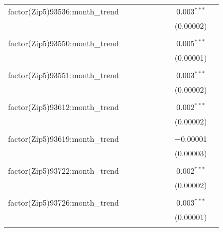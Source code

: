 \begin{table}[H]
{\begin{tabular}{@{\extracolsep{5pt}}lcccccccc}
  factor(Zip5)93536:month\_trend &  &  &  &  &  &  & 0.003$^{***}$ &  \\  

   &  &  &  &  &  &  & (0.00002) &  \\  

   & & & & & & & & \\  

  factor(Zip5)93550:month\_trend &  &  &  &  &  &  & 0.005$^{***}$ &  \\  

   &  &  &  &  &  &  & (0.00001) &  \\  

   & & & & & & & & \\  

  factor(Zip5)93551:month\_trend &  &  &  &  &  &  & 0.003$^{***}$ &  \\  

   &  &  &  &  &  &  & (0.00002) &  \\  

   & & & & & & & & \\  

  factor(Zip5)93612:month\_trend &  &  &  &  &  &  & 0.002$^{***}$ &  \\  

   &  &  &  &  &  &  & (0.00002) &  \\  

   & & & & & & & & \\  

  factor(Zip5)93619:month\_trend &  &  &  &  &  &  & $-$0.00001 &  \\  

   &  &  &  &  &  &  & (0.00003) &  \\  

   & & & & & & & & \\  

  factor(Zip5)93722:month\_trend &  &  &  &  &  &  & 0.002$^{***}$ &  \\  

   &  &  &  &  &  &  & (0.00002) &  \\  

   & & & & & & & & \\  

  factor(Zip5)93726:month\_trend &  &  &  &  &  &  & 0.003$^{***}$ &  \\  

   &  &  &  &  &  &  & (0.00001) &  \\  

   & & & & & & & & \\  


\end{tabular}}
\end{table}
